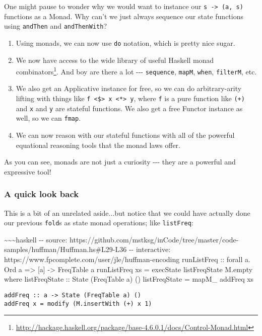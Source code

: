 \documentclass[]{article}
\renewcommand{\href}[2]{#2\footnote{\url{#1}}}
\begin{document}
One might pause to wonder why we would want to instance our
\texttt{s\ -\textgreater{}\ (a,\ s)} functions as a Monad. Why can't we just
always sequence our state functions using \texttt{andThen} and
\texttt{andThenWith}?

\begin{enumerate}
\item
  Using monads, we can now use \texttt{do} notation, which is pretty nice sugar.
\item
  We now have access to the wide library of useful Haskell
  \href{http://hackage.haskell.org/package/base-4.6.0.1/docs/Control-Monad.html}{monad
  combinators}. And boy are there a lot -\/-\/- \texttt{sequence},
  \texttt{mapM}, \texttt{when}, \texttt{filterM}, etc.
\item
  We also get an Applicative instance for free, so we can do arbitrary-arity
  lifting with things like
  \texttt{f\ \textless{}\$\textgreater{}\ x\ \textless{}*\textgreater{}\ y},
  where \texttt{f} is a pure function like \texttt{(+)} and \texttt{x} and
  \texttt{y} are stateful functions. We also get a free Functor instance as
  well, so we can \texttt{fmap}.
\item
  We can now reason with our stateful functions with all of the powerful
  equational reasoning tools that the monad laws offer.
\end{enumerate}

As you can see, monads are not just a curiosity -\/-\/- they are a powerful and
expressive tool!

\subsubsection{A quick look back}

This is a bit of an unrelated aside...but notice that we could have actually
done our previous \texttt{fold}s as state monad operations; like
\texttt{listFreq}:

\textasciitilde{}\textasciitilde{}\textasciitilde{}haskell -\/- source:
https://github.com/mstksg/inCode/tree/master/code-samples/huffman/Huffman.hs\#L29-L36
-\/- interactive: https://www.fpcomplete.com/user/jle/huffman-encoding
runListFreq :: forall a. Ord a =\textgreater{} {[}a{]} -\textgreater{} FreqTable
a runListFreq xs = execState listFreqState M.empty where listFreqState :: State
(FreqTable a) () listFreqState = mapM\_ addFreq xs

\begin{verbatim}
addFreq :: a -> State (FreqTable a) ()
addFreq x = modify (M.insertWith (+) x 1)
\end{verbatim}
\end{document}
